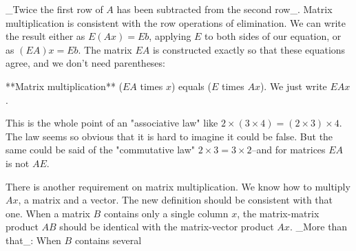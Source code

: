 _Twice the first row of \(A\) has been subtracted from the second row_. Matrix multiplication is consistent with the row operations of elimination. We can write the result either as \(E(Ax)=Eb\), applying \(E\) to both sides of our equation, or as \((EA)x=Eb\). The matrix \(EA\) is constructed exactly so that these equations agree, and we don't need parentheses:

**Matrix multiplication** (\(EA\) times \(x\)) equals (\(E\) times \(Ax\)). We just write \(EAx\).

This is the whole point of an "associative law" like \(2\times(3\times 4)=(2\times 3)\times 4\). The law seems so obvious that it is hard to imagine it could be false. But the same could be said of the "commutative law" \(2\times 3=3\times 2\)--and for matrices \(EA\) is not \(AE\).

There is another requirement on matrix multiplication. We know how to multiply \(Ax\), a matrix and a vector. The new definition should be consistent with that one. When a matrix \(B\) contains only a single column \(x\), the matrix-matrix product \(AB\) should be identical with the matrix-vector product \(Ax\). _More than that_: When \(B\) contains several 